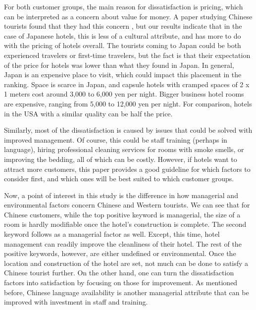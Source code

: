 \documentclass[smallextended,natbib]{svjour3}       %
\begin{document}
For both customer groups, the main reason for dissatisfaction is pricing, which can be interpreted as a concern about value for money. A paper studying Chinese tourists found that they had this concern \cite[][]{truong2009}, but our results indicate that in the case of Japanese hotels, this is less of a cultural attribute, and has more to do with the pricing of hotels overall. The tourists coming to Japan could be both experienced travelers or first-time travelers, but the fact is that their expectation of the price for hotels was lower than what they found in Japan. In general, Japan is an expensive place to visit, which could impact this placement in the ranking. Space is scarce in Japan, and capsule hotels with cramped spaces of 2 x 1  meters cost around 3,000 to 6,000 yen per night. Bigger business hotel rooms are expensive, ranging from 5,000 to 12,000 yen per night. For comparison, hotels in the USA with a similar quality can be half the price. 

Similarly, most of the dissatisfaction is caused by issues that could be solved with improved management. Of course, this could be staff training (perhaps in language), hiring professional cleaning services for rooms with smoke smells, or improving the bedding, all of which can be costly. However, if hotels want to attract more customers, this paper provides a good guideline for which factors to consider first, and which ones will be best suited to which customer groups. 

Now, a point of interest in this study is the difference in how managerial and environmental factors concern Chinese and Western tourists. We can see that for Chinese customers, while the top positive keyword is managerial, the size of a room is hardly modifiable once the hotel's construction is complete. The second keyword follows as a managerial factor as well. Except, this time, hotel management can readily improve the cleanliness of their hotel. The rest of the positive keywords, however, are either undefined or environmental. Once the location and construction of the hotel are set, not much can be done to satisfy a Chinese tourist further. On the other hand, one can turn the dissatisfaction factors into satisfaction by focusing on those for improvement. As mentioned before, Chinese language availability is another managerial attribute that can be improved with investment in staff and training. 
\end{document}
